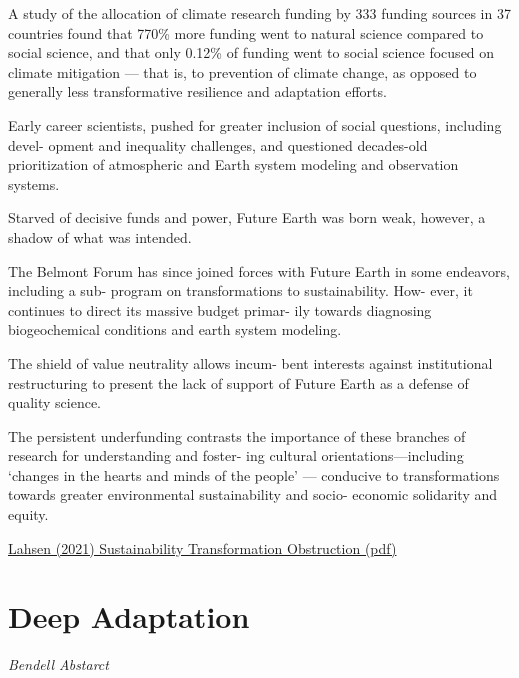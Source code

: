 \documentclass[
]{book}
\begin{document}
A study of the allocation of climate research funding by 333 funding sources in 37
countries found that 770\% more funding went to natural science compared to social science,
and that only 0.12\% of funding went to social science focused on
climate mitigation --- that is,
to prevention of climate change, as opposed to
generally less transformative resilience and adaptation efforts.

Early career scientists, pushed for
greater inclusion of social questions, including devel-
opment and inequality challenges, and questioned
decades-old prioritization of atmospheric and Earth
system modeling and observation systems.

Starved of decisive funds
and power, Future Earth was born weak, however,
a shadow of what was intended.

The Belmont Forum has since joined forces with
Future Earth in some endeavors, including a sub-
program on transformations to sustainability. How-
ever, it continues to direct its massive budget primar-
ily towards diagnosing biogeochemical conditions
and earth system modeling.

The shield of value neutrality allows incum-
bent interests against institutional restructuring to
present the lack of support of Future Earth as a
defense of quality science.

The persistent underfunding contrasts the importance of these
branches of research for understanding and foster-
ing cultural orientations---including `changes in the
hearts and minds of the people' --- conducive to transformations towards
greater environmental sustainability and socio-
economic solidarity and equity.

\href{pdf/Lahsen_2021_Sustainability_Obstruction.pdf}{Lahsen (2021) Sustainability Transformation Obstruction (pdf)}

\hypertarget{deep-adaptation-1}{%
\section{Deep Adaptation}\label{deep-adaptation-1}}

\emph{Bendell Abstarct}
\end{document}
